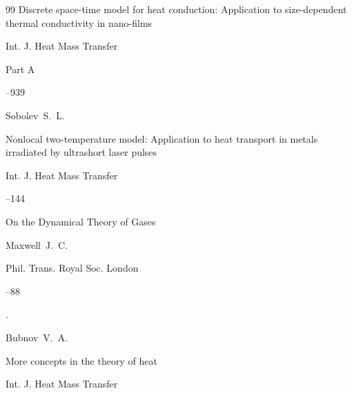 \begin{thebibliography}{99}
\paper Discrete space-time model for heat conduction: Application to size-dependent thermal conductivity in nano-films

\jour Int. J. Heat Mass Transfer



\issueinfo Part A

--939




\by Sobolev~S.~L.

\paper Nonlocal two-temperature model: Application to heat transport in metals irradiated by ultrashort laser pulses

\jour Int. J. Heat Mass Transfer



–144







\paper On the Dynamical Theory of Gases

\by  Maxwell~J.~C. 

\jour Phil. Trans. Royal Soc. London



–88

\moreref 

 \nofrills

\moreref 

 \nofrills

\moreref 

 \nofrills

\moreref 

. \nofrills










\by Bubnov~V.~A.

\paper More concepts in the theory of heat

\jour Int. J. Heat Mass Transfer


\end{thebibliography}
